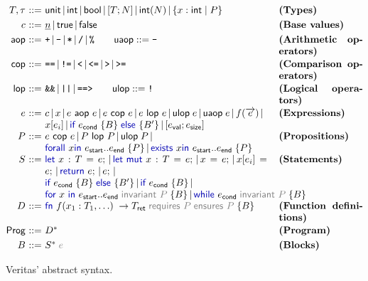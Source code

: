 \begin{figure}[H]
{\small
\[
\renewcommand{\arraystretch}{1.09}
\begin{array}{@{}r@{\ }c@{\ }l@{\hspace{1.2em}}p{0.25\textwidth}@{}}
  T, \tau & ::= &
  \parbox[t]{0.66\textwidth}{
    $\textsf{unit} \,|\, \textsf{int} \,|\, \textsf{bool} \,|\, [T; N] \,|\, \textsf{int}(N) \,|\, \{ x:\textsf{int} \mid P \}$
  }
  & \textbf{(Types)} \\[2pt]
  c & ::= &
  \underline{n} \,|\, \textsf{true} \,|\, \textsf{false}
  & \textbf{(Base values)} \\[2pt]
  \textsf{aop} & ::= &
  \texttt{+} \,|\, \texttt{-} \,|\, \texttt{*} \,|\, \texttt{/} \,|\, \texttt{\%}
  \qquad \textsf{uaop} ::= \texttt{-}
  & \textbf{(Arithmetic operators)} \\[2pt]
  \textsf{cop} & ::= &
  \texttt{==} \,|\, \texttt{!=} \,|\, \texttt{<} \,|\, \texttt{<=} \,|\, \texttt{>} \,|\, \texttt{>=}
  & \textbf{(Comparison operators)} \\[2pt]
  \textsf{lop} & ::= &
  \texttt{\&\&} \,|\, \texttt{||} \,|\, \texttt{==>}
  \qquad \textsf{ulop} ::= \texttt{!}
  & \textbf{(Logical operators)} \\[2pt]
  e & ::= &
  \parbox[t]{0.66\textwidth}{
    $c \,|\, x \,|\, e \textsf{ aop } e \,|\, e \textsf{ cop } e \,|\, e \textsf{ lop } e \,|\, \textsf{ulop}\; e \,|\, \textsf{uaop}\; e \,|\, f(\overrightarrow{e}) \,|\, {}$\\
    $x[e_i] \,|\, \kw{if } e_\textsf{cond}\; \{B\}\; \kw{else } \{B'\} \,|\, [e_\textsf{val}; e_\textsf{size}]$
  }
  & \textbf{(Expressions)} \\[4pt]
  P & ::= &
  \parbox[t]{0.66\textwidth}{
    $e \textsf{ cop } e \,|\, P \textsf{ lop } P \,|\, \textsf{ulop}\; P \,|\, {}$\\
    $\kw{forall } x \kw{in } e_\textsf{start}..e_\textsf{end}\;\{P\} \,|\, \kw{exists } x \kw{in } e_\textsf{start}..e_\textsf{end}\;\{P\}$
  }
  & \textbf{(Propositions)} \\[4pt]
  S & ::= &
  \parbox[t]{0.66\textwidth}{
    $\kw{let } x:T = e; \,|\, \kw{let mut } x:T = e; \,|\, x = e; \,|\, x[e_i] = e; \,|\, \kw{return } e; \,|\, e; \,|\, {}$\\
    $\kw{if } e_\textsf{cond}\; \{B\}\; \kw{else } \{B'\} \,|\, \kw{if } e_\textsf{cond}\; \{B\} \,|\, {}$\\ 
    $\kw{for } x \kw{ in } e_\textsf{start}..e_\textsf{end}\; \optclause{\textsf{invariant } P}\; \{B\} \,|\, \kw{while } e_\textsf{cond}\; \optclause{\textsf{invariant } P}\; \{B\}$
  }
  & \textbf{(Statements)} \\[4pt]
  D & ::= &
  \parbox[t]{0.66\textwidth}{
    $\kw{fn } f(x_1:T_1, \ldots)\; \rightarrow T_\textsf{ret}\; \optclause{\textsf{requires } P}\;\optclause{\textsf{ensures } P}\; \{B\}$
  }
  & \textbf{(Function definitions)} \\[2pt]
  \textsf{Prog} & ::= &
  D^*
  & \textbf{(Program)} \\[2pt]
  B & ::= &
  S^*\; \optclause{e}
  & \textbf{(Blocks)}
\end{array}
\]
}
\caption{Veritas' abstract syntax.}
\label{fig:veritas-syntax}
\end{figure}


